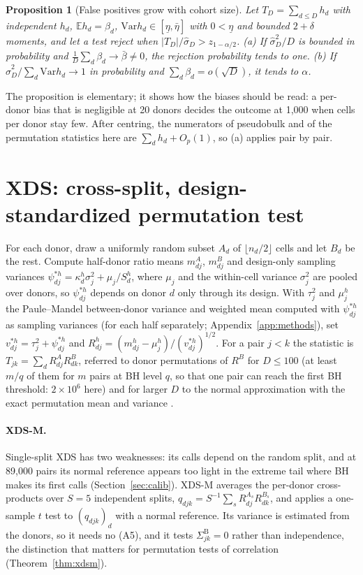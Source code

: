 \documentclass[10pt,letterpaper]{article}
\newtheorem{proposition}{Proposition}
\theoremstyle{definition}
\theoremstyle{remark}
\newcommand{\SB}{\Sigma^{\mathrm{B}}}
\newcommand{\E}{\mathbb{E}}
\newcommand{\Var}{\mathrm{Var}}
\begin{document}
\begin{proposition}[False positives grow with cohort size]\label{prop:growth}
Let $T_D=\sum_{d\le D}h_d$ with independent $h_d$, $\E h_d=\beta_d$, $\Var h_d\in[\underline\eta,\bar\eta]$ with $0<\underline\eta$ and bounded $2+\delta$ moments, and let a test reject when $|T_D|/\hat\sigma_D>z_{1-\alpha/2}$. (a) If $\hat\sigma_D^2/D$ is bounded in probability and $\frac1D\sum_d\beta_d\to\bar\beta\neq0$, the rejection probability tends to one. (b) If $\hat\sigma_D^2/\sum_d\Var h_d\to1$ in probability and $\sum_d\beta_d=o(\sqrt D)$, it tends to $\alpha$.
\end{proposition}

The proposition is elementary; it shows how the biases should be read: a per-donor bias that is negligible at 20 donors decides the outcome at 1{,}000 when cells per donor stay few. After centring, the numerators of pseudobulk and of the permutation statistics here are $\sum_dh_d+O_p(1)$, so (a) applies pair by pair.

\section{XDS: cross-split, design-standardized permutation test}\label{sec:xds}

For each donor, draw a uniformly random subset $A_d$ of $\lfloor n_d/2\rfloor$ cells and let $B_d$ be the rest. Compute half-donor ratio means $m^A_{dj}$, $m^B_{dj}$ and design-only sampling variances $\psi^{*h}_{dj}=\kappa^h_d\sigma_j^2+\mu_j/S^h_d$, where $\mu_j$ and the within-cell variance $\sigma^2_j$ are pooled over donors, so $\psi^{*h}_{dj}$ depends on donor $d$ only through its design. With $\tau^2_j$ and $\mu^h_j$ the Paule--Mandel between-donor variance and weighted mean computed with $\psi^{*h}_{dj}$ as sampling variances (for each half separately; Appendix~\ref{app:methods}), set $v^{*h}_{dj}=\tau_j^2+\psi^{*h}_{dj}$ and $R^h_{dj}=(m^h_{dj}-\mu^h_j)/(v^{*h}_{dj})^{1/2}$. For a pair $j<k$ the statistic is $T_{jk}=\sum_d R^A_{dj}R^B_{dk}$, referred to donor permutations of $R^B$ for $D\le100$ (at least $m/q$ of them for $m$ pairs at BH level $q$, so that one pair can reach the first BH threshold: $2\times10^6$ here) and for larger $D$ to the normal approximation with the exact permutation mean and variance \citep{Hoeffding1951}.

\paragraph{XDS-M.} Single-split XDS has two weaknesses: its calls depend on the random split, and at 89{,}000 pairs its normal reference appears too light in the extreme tail where BH makes its first calls (Section~\ref{sec:calib}). XDS-M averages the per-donor cross-products over $S=5$ independent splits, $q_{djk}=S^{-1}\sum_{s}R^{A_s}_{dj}R^{B_s}_{dk}$, and applies a one-sample $t$ test to $(q_{djk})_d$ with a normal reference. Its variance is estimated from the donors, so it needs no (A5), and it tests $\SB_{jk}=0$ rather than independence, the distinction that matters for permutation tests of correlation \citep{DiCiccioRomano2017} (Theorem~\ref{thm:xdsm}).
\end{document}
